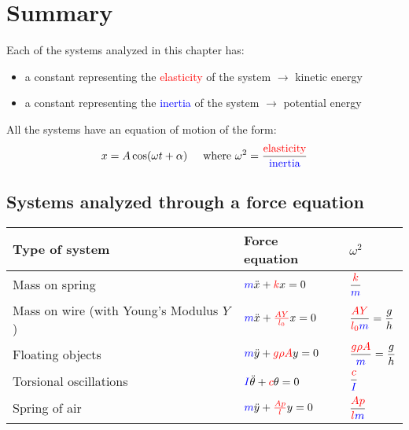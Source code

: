 \documentclass[11pt,letterpaper,titlepage,oneside]{book}
\begin{document}
\section{Summary}
Each of the systems analyzed in this chapter has:
\begin{itemize}
	\item a constant representing the \textcolor{red}{elasticity} of the system $\longrightarrow$ kinetic energy
	\item a constant representing the \textcolor{blue}{inertia} of the system $\longrightarrow$ potential energy
\end{itemize}

All the systems have an equation of motion of the form:
\[x = A \cos(\omega t+\alpha)\hspace{0.5cm}\text{where }\omega^2 = \frac{\color{red}{\text{elasticity}}}{\color{blue}\text{inertia}}\]

\subsection{Systems analyzed through a force equation}
\begin{center}
	\renewcommand{\arraystretch}{2.5}
\begin{tabular}{lll}
	\hline
	Type of system & Force equation & $\omega^2$ \\ \hline
	Mass on spring &
		$\textcolor{blue}{m}\ddot{x} + \textcolor{red}{k}x = 0$ &
		$\dfrac{\color{red}{k}}{\color{blue}m}$
		\\
	\parbox{3cm}{Mass on wire \footnotesize{(with Young's Modulus $Y$)}} &
		$\textcolor{blue}{m}\ddot{x} + \textcolor{red}{\frac{AY}{l_0}}x = 0$ &
		$\dfrac{\color{red}{AY}}{\color{red}{l_0}\color{blue}m} = \dfrac{g}{h}$ 
		\\
	Floating objects &
		$\textcolor{blue}{m}\ddot{y} + \textcolor{red}{g\rho A}y = 0$ &
		$\dfrac{\color{red}{g\rho A}}{\color{blue}m} = \dfrac{g}{h}$ 
		\\
	Torsional oscillations &
		$\textcolor{blue}{I}\ddot{\theta} + \textcolor{red}{c}\theta = 0$ &
		$\dfrac{\color{red}{c}}{\color{blue}I}$ 
		\\
	Spring of air &
		$\textcolor{blue}{m}\ddot{y} + \textcolor{red}{\frac{Ap}{l}}y = 0$ &
		$\dfrac{\color{red}{Ap}}{\color{red}{l}\color{blue}m}$ 
		\\
	\hline
\end{tabular}
\renewcommand{\arraystretch}{1}
\end{center}
\end{document}
